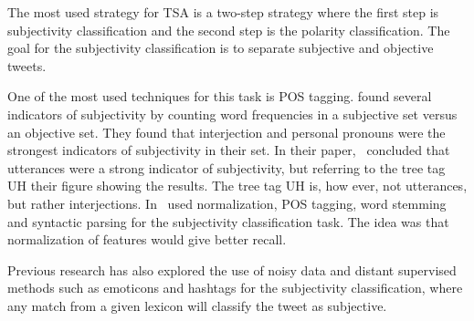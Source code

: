 The most used strategy for TSA is a two-step strategy where the first step is subjectivity classification and the second step is the polarity classification. The goal for the subjectivity classification is to separate subjective and objective tweets.

One of the most used techniques for this task is POS tagging. \cite{article:pak} found several indicators of subjectivity by counting word frequencies in a subjective set versus an objective set. They found that interjection and personal pronouns were the strongest indicators of subjectivity in their set. In their paper,~\cite{article:pak} concluded that utterances were a strong indicator of subjectivity, but referring to the tree tag UH their figure showing the results. The tree tag UH is, how ever, not utterances, but rather interjections. In~\cite{article:jiang} used normalization, POS tagging, word stemming and syntactic parsing for the subjectivity classification task. The idea was that normalization of features would give better recall.

Previous research has also explored the use of noisy data and distant supervised methods such as emoticons and hashtags for the subjectivity classification, where any match from a given lexicon will classify the tweet as subjective.